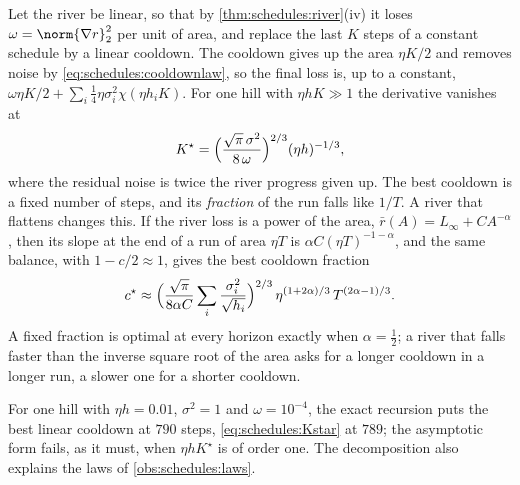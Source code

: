 \begin{refsection}
\begin{heuristic}
Let the river be linear, so that by \cref{thm:schedules:river}(iv) it loses $\omega=\norm{\nabla r}_2^2$ per unit of area, and replace the last $K$ steps of a constant schedule by a linear cooldown. The cooldown gives up the area $\eta K/2$ and removes noise by \eqref{eq:schedules:cooldownlaw}, so the final loss is, up to a constant, $\omega\eta K/2+\sum_i\frac14\eta\sigma_i^2\chi(\eta h_iK)$. For one hill with $\eta hK\gg1$ the derivative vanishes at
\begin{equation}\label{eq:schedules:Kstar}
  K^\star=\Bigl(\frac{\sqrt\pi\,\sigma^2}{8\,\omega}\Bigr)^{2/3}(\eta h)^{-1/3},
\end{equation}
where the residual noise is twice the river progress given up. The best cooldown is a fixed number of steps, and its \emph{fraction} of the run falls like $1/T$. A river that flattens changes this. If the river loss is a power of the area, $\bar r(A)=L_\infty+CA^{-\alpha}$, then its slope at the end of a run of area $\eta T$ is $\alpha C(\eta T)^{-1-\alpha}$, and the same balance, with $1-c/2\approx1$, gives the best cooldown fraction
\begin{equation}\label{eq:schedules:cstar}
  c^\star\approx\Bigl(\frac{\sqrt\pi}{8\alpha C}\sum_i\frac{\sigma_i^2}{\sqrt{h_i}}\Bigr)^{2/3}\,\eta^{(1+2\alpha)/3}\,T^{(2\alpha-1)/3} .
\end{equation}
A fixed fraction is optimal at every horizon exactly when $\alpha=\frac12$; a river that falls faster than the inverse square root of the area asks for a longer cooldown in a longer run, a slower one for a shorter cooldown.\qedhere
\end{heuristic}

For one hill with $\eta h=0.01$, $\sigma^2=1$ and $\omega=10^{-4}$, the exact recursion puts the best linear cooldown at $790$ steps, \eqref{eq:schedules:Kstar} at $789$; the asymptotic form fails, as it must, when $\eta hK^\star$ is of order one. The decomposition also explains the laws of \cref{obs:schedules:laws}.


\end{refsection}
